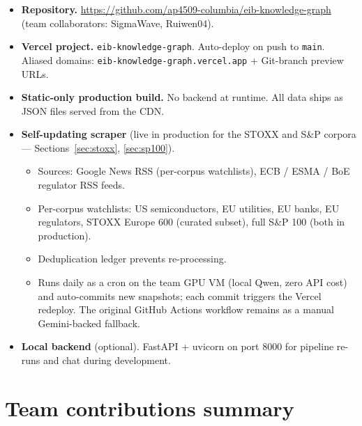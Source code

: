 \documentclass[11pt]{article}
\begin{document}
\begin{itemize}
  \item \textbf{Repository.} \url{https://github.com/ap4509-columbia/eib-knowledge-graph} (team collaborators: SigmaWave, Ruiwen04).
  \item \textbf{Vercel project.} \texttt{eib-knowledge-graph}. Auto-deploy on push to \texttt{main}. Aliased domains: \texttt{eib-knowledge-graph.vercel.app} + Git-branch preview URLs.
  \item \textbf{Static-only production build.} No backend at runtime. All data ships as JSON files served from the CDN.
  \item \textbf{Self-updating scraper} (live in production for the STOXX and S\&P corpora --- Sections~\ref{sec:stoxx}, \ref{sec:sp100}).
    \begin{itemize}
      \item Sources: Google News RSS (per-corpus watchlists), ECB / ESMA / BoE regulator RSS feeds.
      \item Per-corpus watchlists: US semiconductors, EU utilities, EU banks, EU regulators, STOXX Europe 600 (curated subset), full S\&P 100 (both in production).
      \item Deduplication ledger prevents re-processing.
      \item Runs daily as a cron on the team GPU VM (local Qwen, zero API cost) and auto-commits new snapshots; each commit triggers the Vercel redeploy. The original GitHub Actions workflow remains as a manual Gemini-backed fallback.
    \end{itemize}
  \item \textbf{Local backend} (optional). FastAPI + uvicorn on port 8000 for pipeline re-runs and chat during development.
\end{itemize}

\section{Team contributions summary}
\end{document}
